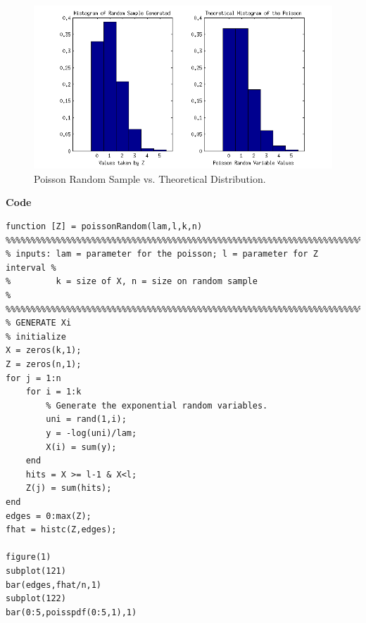 \documentclass[12pt,a4paper]{article}
\begin{document}
\begin{figure}[ht!] 
\begin{center}
\includegraphics[scale=.9]{q2graph1.png}
\caption{Poisson Random Sample vs. Theoretical Distribution.}
\label{q2fig1}
\end{center}
\end{figure}
\FloatBarrier
\clearpage
\textbf{Code}\\
\begin{verbatim}
function [Z] = poissonRandom(lam,l,k,n)
%%%%%%%%%%%%%%%%%%%%%%%%%%%%%%%%%%%%%%%%%%%%%%%%%%%%%%%%%%%%%%%%%%%%%%%%%
% inputs: lam = parameter for the poisson; l = parameter for Z interval %
%         k = size of X, n = size on random sample                      %
%%%%%%%%%%%%%%%%%%%%%%%%%%%%%%%%%%%%%%%%%%%%%%%%%%%%%%%%%%%%%%%%%%%%%%%%%
% GENERATE Xi
% initialize
X = zeros(k,1);
Z = zeros(n,1);
for j = 1:n
    for i = 1:k
        % Generate the exponential random variables.
        uni = rand(1,i);
        y = -log(uni)/lam;
        X(i) = sum(y);
    end
    hits = X >= l-1 & X<l;
    Z(j) = sum(hits);
end
edges = 0:max(Z);
fhat = histc(Z,edges);

figure(1)
subplot(121)
bar(edges,fhat/n,1)
subplot(122)
bar(0:5,poisspdf(0:5,1),1)
\end{verbatim}
\clearpage
\end{document}
